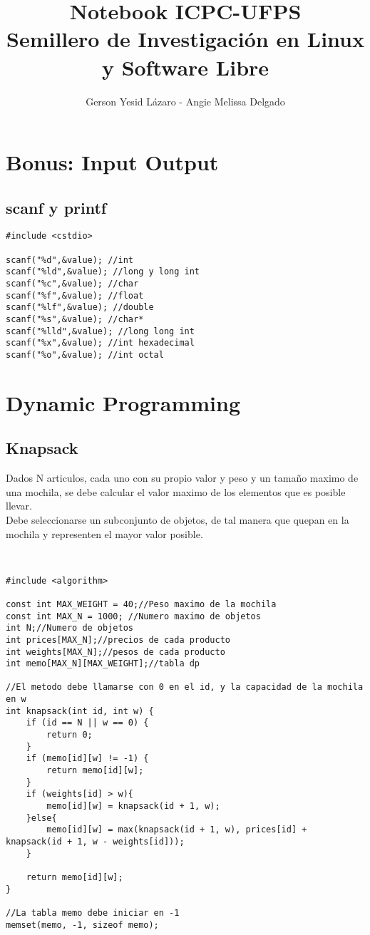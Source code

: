 \documentclass[11pt,letterpaper,twocolumn,twosided]{article}
\begin{document}
\title{Notebook ICPC-UFPS\\Semillero de Investigaci\'on en Linux y Software Libre}
\author{Gerson Yesid L\'azaro - Angie Melissa Delgado}
\maketitle
\tableofcontents
{}


\section{Bonus: Input Output}

\subsection{scanf y printf}
\begin{lstlisting}
#include <cstdio>

scanf("%d",&value); //int
scanf("%ld",&value); //long y long int
scanf("%c",&value); //char 
scanf("%f",&value); //float
scanf("%lf",&value); //double
scanf("%s",&value); //char*
scanf("%lld",&value); //long long int
scanf("%x",&value); //int hexadecimal
scanf("%o",&value); //int octal
\end{lstlisting}

\section{Dynamic Programming}

\subsection{Knapsack}
Dados N articulos, cada uno con su propio valor y peso y un tamaño maximo de una mochila, se debe calcular el valor maximo de los elementos que es posible llevar.\\
Debe seleccionarse un subconjunto de objetos, de tal manera que quepan en la mochila y representen el mayor valor posible.
\begin{lstlisting}


#include <algorithm>

const int MAX_WEIGHT = 40;//Peso maximo de la mochila
const int MAX_N = 1000; //Numero maximo de objetos
int N;//Numero de objetos 
int prices[MAX_N];//precios de cada producto
int weights[MAX_N];//pesos de cada producto
int memo[MAX_N][MAX_WEIGHT];//tabla dp

//El metodo debe llamarse con 0 en el id, y la capacidad de la mochila en w
int knapsack(int id, int w) {
  	if (id == N || w == 0) {
  		return 0;
  	}
  	if (memo[id][w] != -1) {
  		return memo[id][w];
  	}
  	if (weights[id] > w){
  		memo[id][w] = knapsack(id + 1, w);
  	}else{
  		memo[id][w] = max(knapsack(id + 1, w), prices[id] + knapsack(id + 1, w - weights[id]));
  	}
  	
  	return memo[id][w];
}

//La tabla memo debe iniciar en -1
memset(memo, -1, sizeof memo);
\end{lstlisting}
\end{document}
